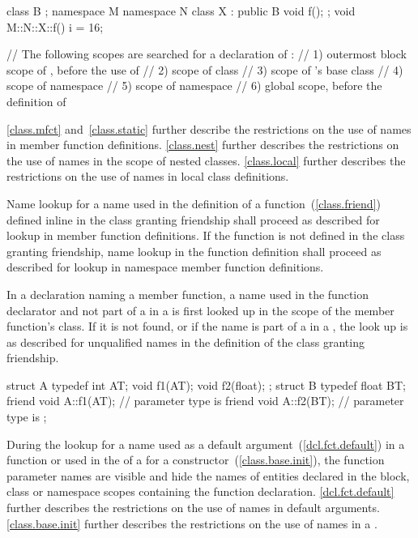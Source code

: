 \enterexample 
\begin{codeblock}
class B { };
namespace M {
	namespace N {
		class X : public B {
			void f();
		};
	}
}
void M::N::X::f() {
	i = 16;
}

// The following scopes are searched for a declaration of :
// 1) outermost block scope of , before the use of 
// 2) scope of class 
// 3) scope of 's base class 
// 4) scope of namespace 
// 5) scope of namespace 
// 6) global scope, before the definition of 
\end{codeblock}
\exitexampleb \enternote \ref{class.mfct} and~\ref{class.static} further
describe the restrictions on the use of names in member function
definitions. \ref{class.nest} further describes the restrictions on the
use of names in the scope of nested classes. \ref{class.local} further
describes the restrictions on the use of names in local class
definitions. \exitnote

\pnum
Name lookup for a name used in the definition of a 
function~(\ref{class.friend}) defined inline in the class granting
friendship shall proceed as described for lookup in member function
definitions. If the  function is not defined in the class
granting friendship, name lookup in the  function
definition shall proceed as described for lookup in namespace member
function definitions.

\pnum
In a  declaration naming a member function, a name used in
the function declarator and not part of a 
in a  is first looked up in the scope of the
member function's class. If it is not found, or if the name is part of a
 in a
, the look up is
as described for unqualified names in the definition of the class
granting friendship. \enterexample

\begin{codeblock}
struct A {
	typedef int AT;
	void f1(AT);
	void f2(float);
};
struct B {
	typedef float BT;
	friend void A::f1(AT);  // parameter type is 
	friend void A::f2(BT);  // parameter type is 
};
\end{codeblock}
\exitexampleb

\pnum
During the lookup for a name used as a default
argument~(\ref{dcl.fct.default}) in a function
 or used in the
 of a  for a
constructor~(\ref{class.base.init}), the function parameter names are
visible and hide the names of entities declared in the block, class or
namespace scopes containing the function declaration. \enternote
\ref{dcl.fct.default} further describes the restrictions on the use of
names in default arguments. \ref{class.base.init} further describes the
restrictions on the use of names in a .
\exitnote

